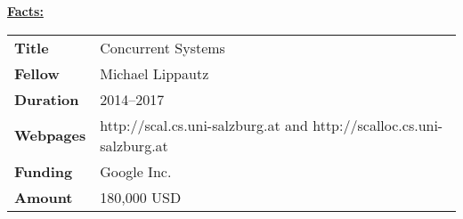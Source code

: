 \textcolor{\workinggroupboxtextcolor}{
	\textbf{\underline{Facts:}}
	\newline
	\newline
	\begin{tabular}{l p{}}
		\textbf{Title} & Concurrent Systems \\
        \textbf{Fellow} & Michael Lippautz \\
		\textbf{Duration} & 2014--2017 \\
		\textbf{Webpages} & http://scal.cs.uni-salzburg.at and http://scalloc.cs.uni-salzburg.at \\
		\textbf{Funding} & Google Inc. \\
		\textbf{Amount} & 180,000 USD
	\end{tabular}
}